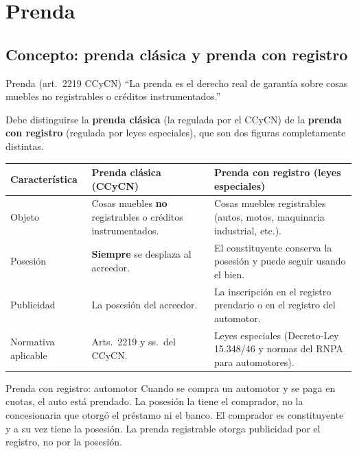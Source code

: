 \documentclass[12pt,oneside]{book}
\begin{document}
\section{Prenda}

\subsection{Concepto: prenda clásica y prenda con registro}

\begin{definition}{Prenda (art.~2219 CCyCN)}
``La prenda es el derecho real de garantía sobre cosas muebles no registrables o créditos instrumentados.''
\end{definition}

Debe distinguirse la \textbf{prenda clásica} (la regulada por el CCyCN) de la \textbf{prenda con registro} (regulada por leyes especiales), que son dos figuras completamente distintas.

\begin{table}[H]
\centering
\begin{tabularx}{\textwidth}{@{}>{\raggedright\arraybackslash}p{}>{\raggedright\arraybackslash}X>{\raggedright\arraybackslash}X@{}}
\toprule
\textbf{Característica} & \textbf{Prenda clásica (CCyCN)} & \textbf{Prenda con registro (leyes especiales)} \\
\midrule
Objeto & Cosas muebles \textbf{no} registrables o créditos instrumentados. & Cosas muebles registrables (autos, motos, maquinaria industrial, etc.). \\
Posesión & \textbf{Siempre} se desplaza al acreedor. & El constituyente conserva la posesión y puede seguir usando el bien. \\
Publicidad & La posesión del acreedor. & La inscripción en el registro prendario o en el registro del automotor. \\
Normativa aplicable & Arts.~2219 y ss.\ del CCyCN. & Leyes especiales (Decreto-Ley 15.348/46 y normas del RNPA para automotores). \\
\bottomrule
\end{tabularx}
\end{table}

\begin{example}{Prenda con registro: automotor}
Cuando se compra un automotor y se paga en cuotas, el auto está prendado. La posesión la tiene el comprador, no la concesionaria que otorgó el préstamo ni el banco. El comprador es constituyente y a su vez tiene la posesión. La prenda registrable otorga publicidad por el registro, no por la posesión.
\end{example}
\end{document}
